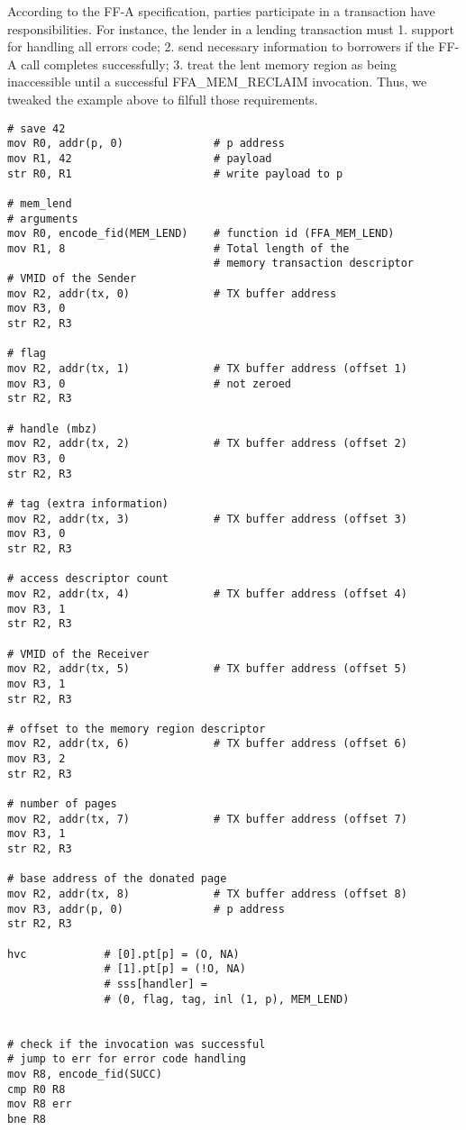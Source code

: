 \documentclass{article}
\begin{document}
\clearpage
According to the FF-A specification, parties participate in a transaction have responsibilities. For instance, the lender in a lending transaction must 1. support for handling all errors code; 2. send necessary information to borrowers if the FF-A call completes successfully; 3. treat the lent memory region as being inaccessible until a successful FFA\_MEM\_RECLAIM invocation. Thus, we tweaked the example above to filfull those requirements.
\begin{lstlisting}[caption={VM 0}]
# save 42
mov R0, addr(p, 0)              # p address
mov R1, 42                      # payload
str R0, R1                      # write payload to p

# mem_lend
# arguments
mov R0, encode_fid(MEM_LEND)    # function id (FFA_MEM_LEND)
mov R1, 8                       # Total length of the
                                # memory transaction descriptor
# VMID of the Sender
mov R2, addr(tx, 0)             # TX buffer address
mov R3, 0
str R2, R3

# flag
mov R2, addr(tx, 1)             # TX buffer address (offset 1)
mov R3, 0                       # not zeroed
str R2, R3

# handle (mbz)
mov R2, addr(tx, 2)             # TX buffer address (offset 2)
mov R3, 0
str R2, R3

# tag (extra information)
mov R2, addr(tx, 3)             # TX buffer address (offset 3)
mov R3, 0
str R2, R3

# access descriptor count
mov R2, addr(tx, 4)             # TX buffer address (offset 4)
mov R3, 1
str R2, R3

# VMID of the Receiver
mov R2, addr(tx, 5)             # TX buffer address (offset 5)
mov R3, 1
str R2, R3

# offset to the memory region descriptor
mov R2, addr(tx, 6)             # TX buffer address (offset 6)
mov R3, 2
str R2, R3

# number of pages
mov R2, addr(tx, 7)             # TX buffer address (offset 7)
mov R3, 1
str R2, R3

# base address of the donated page
mov R2, addr(tx, 8)             # TX buffer address (offset 8)
mov R3, addr(p, 0)              # p address
str R2, R3

hvc            # [0].pt[p] = (O, NA)
               # [1].pt[p] = (!O, NA)
               # sss[handler] =
               # (0, flag, tag, inl (1, p), MEM_LEND)


# check if the invocation was successful
# jump to err for error code handling
mov R8, encode_fid(SUCC)
cmp R0 R8
mov R8 err
bne R8


\end{lstlisting}
\end{document}
